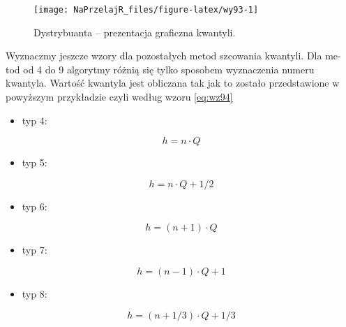 \documentclass[polish,]{book}
\providecommand{\tightlist}{%
  \setlength{\itemsep}{0pt}\setlength{\parskip}{0pt}}
\begin{document}
\begin{figure}[h]

{\centering \texttt{[image: NaPrzelajR\_files/figure-latex/wy93-1]} 

}

\caption{Dystrybuanta – prezentacja graficzna kwantyli.}\label{fig:wy93}
\end{figure}

Wyznaczmy jeszcze wzory dla pozostałych metod szcowania kwantyli. Dla me-
tod od 4 do 9 algorytmy różnią się tylko sposobem wyznaczenia numeru kwantyla.
Wartość kwantyla jest obliczana tak jak to zostało przedstawione w powyższym
przykładzie czyli według wzoru \eqref{eq:wz94}

\begin{itemize}
\tightlist
\item
  typ 4:
\end{itemize}

\begin{equation}
h=n\cdot Q
\label{eq:wz95}
\end{equation}

\begin{itemize}
\tightlist
\item
  typ 5:
\end{itemize}

\begin{equation}
h=n\cdot Q + 1/2
\label{eq:wz96}
\end{equation}

\begin{itemize}
\tightlist
\item
  typ 6:
\end{itemize}

\begin{equation}
h=(n+1)\cdot Q
\label{eq:wz97}
\end{equation}

\begin{itemize}
\tightlist
\item
  typ 7:
\end{itemize}

\begin{equation}
h=(n-1)\cdot Q + 1
\label{eq:wz98}
\end{equation}

\begin{itemize}
\tightlist
\item
  typ 8:
\end{itemize}

\begin{equation}
h=(n+1/3)\cdot Q + 1/3
\label{eq:wz99}
\end{equation}
\end{document}
